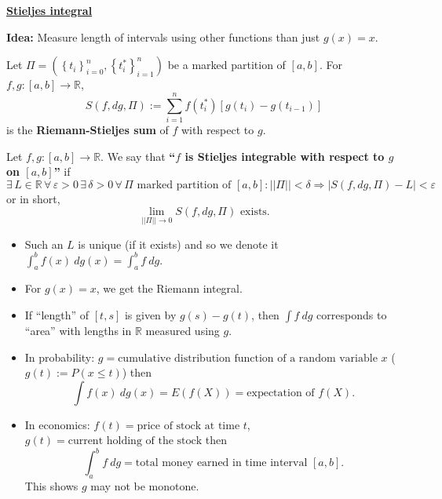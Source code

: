 \documentclass{notes}
\begin{document}
  \newpage
  
  {\boldmath \bfseries \underline{Stieljes integral}}
  
  {\boldmath \bfseries Idea:} Measure length of intervals using other functions than just $g(x) = x$.
  
  \begin{defn}
    Let $\Pi = (\left \{ t_i \right \}_{i = 0}^n, \left \{ t^*_i \right \}_{i = 1}^n)$ be a marked partition of $[a, b]$.
    For $f, g \colon [a, b] \to \mathbb R$, 
    \[
      S(f, dg, \Pi) := \sum_{i = 1}^n f(t^*_i) [g(t_i) - g(t_{i - 1})]
    \]
    is the {\boldmath \bfseries Riemann-Stieljes sum} of $f$ with respect to $g$.
  \end{defn}
  
  \begin{defn}
    Let $f, g \colon [a, b] \to \mathbb R$.
    We say that {\boldmath \bfseries ``$f$ is Stieljes integrable with respect to $g$ on $[a, b]$''} if 
    \[
      \exists \, L \in \mathbb R \, \forall \, \varepsilon > 0 \, \exists \, \delta > 0 \, \forall \, \Pi \text{ marked partition of $[a, b]$}: ||\Pi|| < \delta \Rightarrow \left | S(f, dg, \Pi) - L \right | < \varepsilon
    \]
    or in short, 
    \[
      \lim_{||\Pi|| \to 0} S(f, dg, \Pi) \text{ exists.}
    \]
  \end{defn}
  
  \begin{note}
    \begin{itemize}
      \item Such an $L$ is unique (if it exists) and so we denote it $\int_a^b f(x)\ dg(x) = \int_a^b f\ dg$.

      \item For $g(x) = x$, we get the Riemann integral.
        
      \item If ``length'' of $[t, s]$ is given by $g(s) - g(t)$, then $\int f\ dg$ corresponds to ``area'' with lengths in $\mathbb R$ measured using $g$.
        
      \item In probability: $g = \text{cumulative distribution function of a random variable $x$}$ ($g(t) := P(x \leq t)$) then 
      \[
        \int f(x)\ dg(x) = E(f(X)) = \text{expectation of $f(X)$}.
      \]
      
      \item In economics: $f(t) = \text{price of stock at time $t$}$, $g(t) = \text{current holding of the stock}$ then 
      \[
        \int_a^b f\ dg = \text{total money earned in time interval $[a, b]$.}
      \]
      This shows $g$ may not be monotone.
    \end{itemize}
  \end{note}
  
\end{document}
